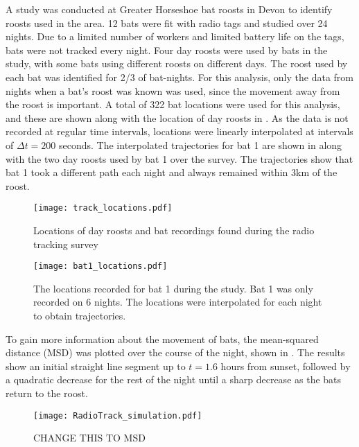 A study was conducted at Greater Horseshoe bat roosts in Devon to identify roosts used in the area. 12 bats were fit with radio tags and studied over 24 nights. Due to a limited number of workers and limited battery life on the tags, bats were not tracked every night. Four day roosts were used by bats in the study, with some bats using different roosts on different days. The roost used by each bat was identified for 2/3 of bat-nights. For this analysis, only  the data from nights when a bat's roost was known was used, since the movement away from the roost is important. A total of 322 bat locations were used for this analysis, and these are shown along with the location of day roosts in . As the data is not recorded at regular time intervals, locations were linearly interpolated at intervals of $\Delta t = 200$ seconds. The interpolated trajectories for bat 1 are shown in  along with the two day roosts used by bat 1 over the survey. The trajectories show that bat 1 took a different path each night and always remained within 3km of the roost.
%
\begin{figure} [h]
    \centering
        \texttt{[image: track\_locations.pdf]}
        \caption{Locations of day roosts and bat recordings found during the radio tracking survey}
    \label{fig:radiotrack_locations}
\end{figure}
%
\begin{figure} [h]
    \centering
        \texttt{[image: bat1\_locations.pdf]}
        \caption{The locations recorded for bat 1 during the study. Bat 1 was only recorded on 6 nights. The locations were interpolated for each night to obtain trajectories.}
    \label{fig:bat1}
\end{figure}
%
To gain more information about the movement of bats, the mean-squared distance (MSD) was plotted over the course of the night, shown in . The results show an initial straight line segment up to $t = 1.6$ hours from sunset, followed by a quadratic decrease for the rest of the night until a sharp decrease as the bats return to the roost.
%
\begin{figure} [h]
    \centering
        \texttt{[image: RadioTrack\_simulation.pdf]}
        \caption{CHANGE THIS TO MSD}
    \label{fig:radiotrack_fit}
\end{figure}
%

